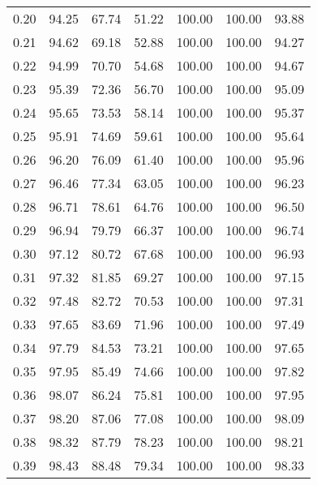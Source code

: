 \begin{tabular}{|c|c|c|c|c|c|c|}
      0.20 &     94.25 &     67.74 &      51.22 &  100.00 &     100.00 &         93.88 \\
      0.21 &     94.62 &     69.18 &      52.88 &  100.00 &     100.00 &         94.27 \\
      0.22 &     94.99 &     70.70 &      54.68 &  100.00 &     100.00 &         94.67 \\
      0.23 &     95.39 &     72.36 &      56.70 &  100.00 &     100.00 &         95.09 \\
      0.24 &     95.65 &     73.53 &      58.14 &  100.00 &     100.00 &         95.37 \\
      0.25 &     95.91 &     74.69 &      59.61 &  100.00 &     100.00 &         95.64 \\
      0.26 &     96.20 &     76.09 &      61.40 &  100.00 &     100.00 &         95.96 \\
      0.27 &     96.46 &     77.34 &      63.05 &  100.00 &     100.00 &         96.23 \\
      0.28 &     96.71 &     78.61 &      64.76 &  100.00 &     100.00 &         96.50 \\
      0.29 &     96.94 &     79.79 &      66.37 &  100.00 &     100.00 &         96.74 \\
      0.30 &     97.12 &     80.72 &      67.68 &  100.00 &     100.00 &         96.93 \\
      0.31 &     97.32 &     81.85 &      69.27 &  100.00 &     100.00 &         97.15 \\
      0.32 &     97.48 &     82.72 &      70.53 &  100.00 &     100.00 &         97.31 \\
      0.33 &     97.65 &     83.69 &      71.96 &  100.00 &     100.00 &         97.49 \\
      0.34 &     97.79 &     84.53 &      73.21 &  100.00 &     100.00 &         97.65 \\
      0.35 &     97.95 &     85.49 &      74.66 &  100.00 &     100.00 &         97.82 \\
      0.36 &     98.07 &     86.24 &      75.81 &  100.00 &     100.00 &         97.95 \\
      0.37 &     98.20 &     87.06 &      77.08 &  100.00 &     100.00 &         98.09 \\
      0.38 &     98.32 &     87.79 &      78.23 &  100.00 &     100.00 &         98.21 \\
      0.39 &     98.43 &     88.48 &      79.34 &  100.00 &     100.00 &         98.33 \\

\end{tabular}
